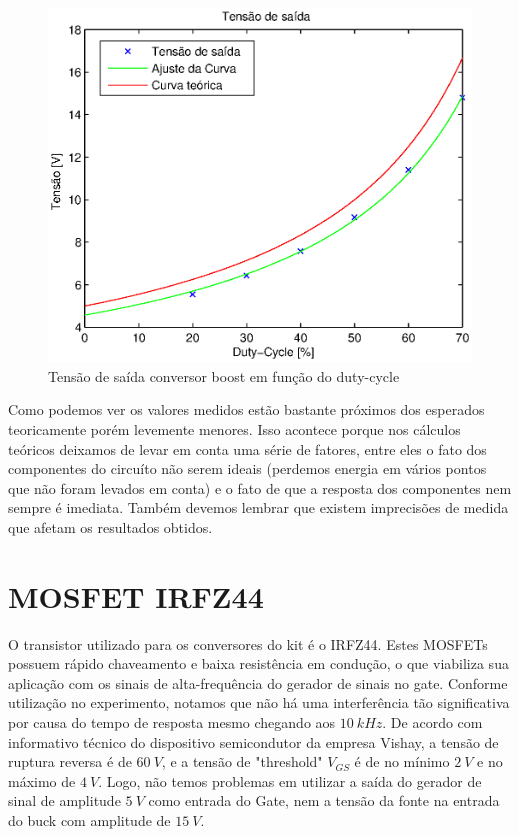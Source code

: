 \documentclass{article}
\begin{document}
\begin{figure}[H]
	\centering
	\includegraphics[width=0.7\linewidth]{Dados/boost/tvd}
	\caption{Tensão de saída conversor boost em função do duty-cycle}
	\label{fig:botvd}
\end{figure}

Como podemos ver os valores medidos estão bastante próximos dos esperados teoricamente porém levemente menores. Isso acontece porque nos cálculos teóricos deixamos de levar em conta uma série de fatores, entre eles o fato dos componentes do circuíto não serem ideais (perdemos energia em vários pontos que não foram levados em conta) e o fato de que a resposta dos componentes nem sempre é imediata. Também devemos lembrar que existem imprecisões de medida que afetam os resultados obtidos.

\section{MOSFET IRFZ44}

O transistor utilizado para os conversores do kit é o IRFZ44. Estes MOSFETs possuem rápido chaveamento e baixa resistência em condução, o que viabiliza sua aplicação com os sinais de alta-frequência do gerador de sinais no gate. Conforme utilização no experimento, notamos que não há uma interferência tão significativa por causa do tempo de resposta mesmo chegando aos $10\ kHz$.
De acordo com informativo técnico do dispositivo semicondutor da empresa Vishay, a tensão de ruptura reversa é de $60\ V$, e a tensão de "threshold" $V_{GS}$ é de no mínimo $2\ V$ e no máximo de $4\ V$. Logo, não temos problemas em utilizar a saída do gerador de sinal de amplitude $5\ V$ como entrada do Gate, nem a tensão da fonte na entrada do buck com amplitude de $15\ V$.
\end{document}
